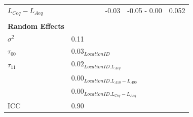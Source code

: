\begin{table}[h!]
\begin{tabular}{@{}l|lccccc@{}}
    $L_{Ceq}-L_{Aeq}$                        & \multicolumn{1}{c}{}                                    &               &                           & -0.03 & -0.05 - 0.00  & 0.052                     \\
    \\
    \textbf{Random Effects}                  &
                                             &
    \multicolumn{1}{l}{}                     &
    \multicolumn{1}{l}{}                     &
    \multicolumn{1}{l}{}                     &
    \multicolumn{1}{l}{}                     &
    \multicolumn{1}{l}{}                                                                                                                                                                               \\
    $\sigma^2$                               &
    0.11                                     &
    \multicolumn{1}{l}{}                     &
    \multicolumn{1}{l}{}                     &
    \multicolumn{1}{l}{}                     &
    \multicolumn{1}{l}{}                     &
    \multicolumn{1}{l}{}                                                                                                                                                                               \\
    $\tau_{00}$                              & \multicolumn{6}{l}{$0.03_{LocationID}$}                                                                                                                 \\
    $\tau_{11}$                              & \multicolumn{6}{l}{$0.02_{LocationID.L_{Aeq}}$}                                                                                                         \\
                                             & \multicolumn{6}{l}{$0.00_{LocationID.L_{A10}-L_{A90}}$}                                                                                                 \\
                                             & \multicolumn{6}{l}{$0.00_{LocationID.L_{Ceq}-L_{Aeq}}$}                                                                                                 \\
    ICC                                      &
    0.90                                     &
    \multicolumn{1}{l}{}                     &
    \multicolumn{1}{l}{}                     &
    \multicolumn{1}{l}{}                     &
    \multicolumn{1}{l}{}                     &
    \multicolumn{1}{l}{}                                                                                                                                                                               \\ \midrule

\end{tabular}
\end{table}

